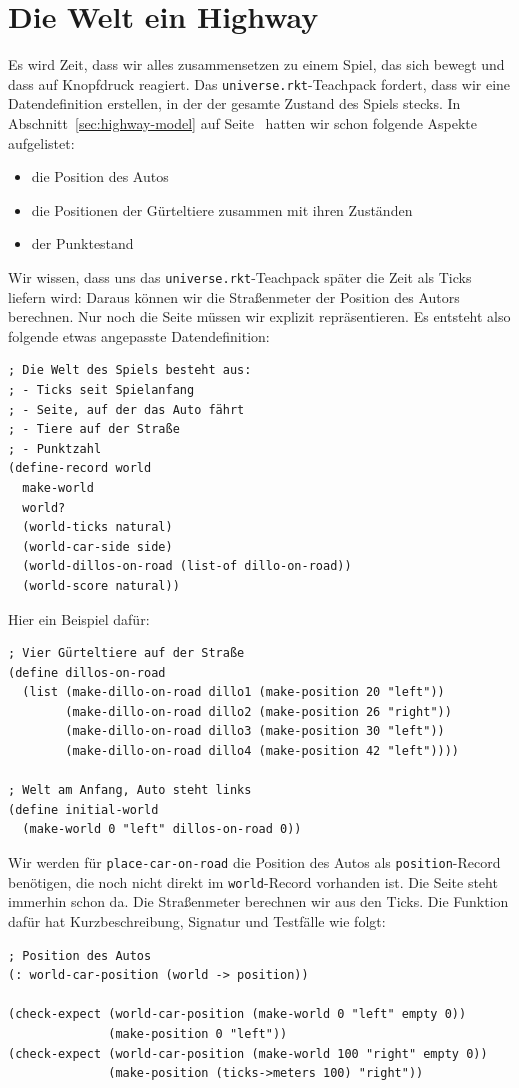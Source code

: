 \section{Die Welt ein Highway}

Es wird Zeit, dass wir alles zusammensetzen zu einem Spiel, das sich
bewegt und dass auf Knopfdruck reagiert.  Das
\texttt{universe.rkt}-Teachpack fordert, dass wir eine Datendefinition
erstellen, in der der gesamte Zustand des Spiels stecks.  In
Abschnitt~\ref{sec:highway-model} auf
Seite~\pageref{sec:highway-model} hatten wir schon folgende Aspekte
aufgelistet:
%
\begin{itemize}
\item die Position des Autos
\item die Positionen der Gürteltiere zusammen mit ihren Zuständen
\item der Punktestand
\end{itemize}
%
Wir wissen, dass uns das \texttt{universe.rkt}-Teachpack später die
Zeit als Ticks liefern wird: Daraus können wir die Straßenmeter der
Position des Autors berechnen.  Nur noch die Seite müssen wir explizit
repräsentieren.  Es entsteht also folgende etwas angepasste Datendefinition:
%
\begin{lstlisting}
; Die Welt des Spiels besteht aus:
; - Ticks seit Spielanfang
; - Seite, auf der das Auto fährt
; - Tiere auf der Straße
; - Punktzahl
(define-record world
  make-world
  world?
  (world-ticks natural)
  (world-car-side side)
  (world-dillos-on-road (list-of dillo-on-road))
  (world-score natural))
\end{lstlisting}
%
Hier ein Beispiel dafür:
%
\begin{lstlisting}
; Vier Gürteltiere auf der Straße
(define dillos-on-road
  (list (make-dillo-on-road dillo1 (make-position 20 "left"))
        (make-dillo-on-road dillo2 (make-position 26 "right"))
        (make-dillo-on-road dillo3 (make-position 30 "left"))
        (make-dillo-on-road dillo4 (make-position 42 "left"))))

; Welt am Anfang, Auto steht links
(define initial-world
  (make-world 0 "left" dillos-on-road 0))
\end{lstlisting}
%
Wir werden für \lstinline{place-car-on-road} die Position des Autos
als \lstinline{position}-Record benötigen, die noch nicht direkt im
\lstinline{world}-Record vorhanden ist.  Die Seite steht immerhin
schon da.  Die Straßenmeter berechnen wir aus den Ticks.  Die Funktion
dafür hat Kurzbeschreibung, Signatur und Testfälle wie folgt:
%
\begin{lstlisting}
; Position des Autos
(: world-car-position (world -> position))

(check-expect (world-car-position (make-world 0 "left" empty 0))
              (make-position 0 "left"))
(check-expect (world-car-position (make-world 100 "right" empty 0))
              (make-position (ticks->meters 100) "right"))
\end{lstlisting}
